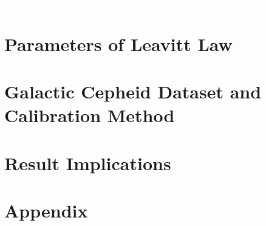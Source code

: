 \documentclass[a4paper, twoside, 12pt]{report}
\begin{document}
\pagestyle{empty} %

\graphicspath{ {../plots/} }

  








\clearpage
\tableofcontents
\cleardoublepage %
\pagestyle{plain} %

\newpage
\listoffigures
\newpage
\listoftables
\textcolor{white}{.}
\thispagestyle{empty}
\newpage
\clearpage
{}

\part{Parameters of Leavitt Law}


\part{Galactic Cepheid Dataset and Calibration Method}


\part{Result Implications}


\part*{Appendix}
\appendix



\end{document}
